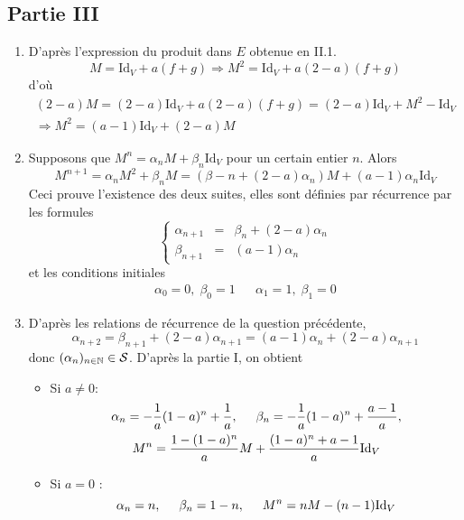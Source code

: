 \subsection*{Partie III}
\begin{enumerate}
\item D'après l'expression du produit dans $E$ obtenue en II.1.
\begin{displaymath}
M = \mathrm{Id}_V + a(f+g) \Rightarrow 
M^2 = \mathrm{Id}_V + a(2-a)(f+g)
\end{displaymath}
d'où
\begin{multline*}
(2-a)M = (2-a)\mathrm{Id}_V + a(2-a)(f+g) = (2-a)\mathrm{Id}_V +M^2 -\mathrm{Id}_V \\
 \Rightarrow M^2 = (a-1)\mathrm{Id}_V +(2-a)M   
\end{multline*}

\item Supposons que $M^n = \alpha_n M +\beta_n \mathrm{Id}_V$ pour un certain entier $n$. Alors
\begin{displaymath}
M^{n+1} = \alpha_n M^2 +\beta_n M = (\beta-n+(2-a)\alpha_n)M + (a-1)\alpha_n \mathrm{Id}_V 
\end{displaymath}
Ceci prouve l'existence des deux suites, elles sont définies par récurrence par les formules
\begin{displaymath}
\left\lbrace \begin{array}{lll}
\alpha_{n+1} & = & \beta_n +(2-a)\alpha_n \\ 
\beta_{n+1} & = & (a-1)\alpha_n 
\end{array}\right. 
\end{displaymath}
et les conditions initiales
\begin{align*}
\alpha_0 = 0,\; \beta_0=1 & & 
\alpha_1=1, \; \beta_1=0
\end{align*}

\item D'après les relations de récurrence de la question précédente,
\begin{displaymath}
\alpha_{n+2} = \beta_{n+1}+(2-a)\alpha_{n+1} = (a-1)\alpha_n + (2-a)\alpha _{n+1}
\end{displaymath}
donc $(\alpha_n)_{n\in\mathbb{N}}\in \mathcal{S}$. D'après la partie I, on obtient
\begin{itemize}
\item Si $a\neq 0$:
\begin{multline*}
\alpha_n = -\frac{1}{a}(1-a)^n+\frac{1}{a}, \hspace{0.5cm}
\beta_n =  -\frac{1}{a}(1-a)^n+\frac{a-1}{a},\\
M^n = \frac{1-(1-a)^n}{a}M + \frac{(1-a)^n+a-1}{a}\text{Id}_V
\end{multline*}
\item Si $a=0$ :
\begin{displaymath}
\alpha_n = n, \hspace{0.5cm}
\beta_n = 1-n, \hspace{0.5cm}
M^n = n M -(n-1)\text{Id}_V
\end{displaymath}
\end{itemize}
\end{enumerate}

